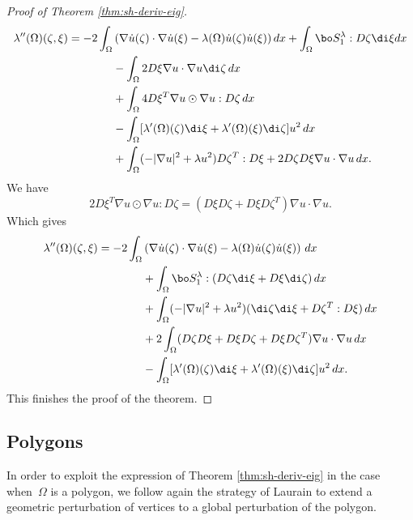 \begin{proof}[Proof of Theorem \ref{thm:sh-deriv-eig}]
\begin{align*}
\lambda''(\Omega)(\zeta,\xi)  = -2\int_\Omega&\left(\nabla \dot u(\zeta)\cdot \nabla \dot u(\xi) - \lambda(\Omega)\dot u(\zeta)\dot u(\xi)\right)dx + \int_\Omega \bo S_1^\lambda :D\zeta \di \xi dx\\
&-\int_\Omega 2D\xi \nabla u \cdot \nabla u \di \zeta\, dx\\
&+\int_\Omega 4 D\xi^T \nabla u \odot \nabla u :D\zeta\, dx \\
& - \int_\Omega [\lambda'(\Omega)(\zeta) \di \xi +\lambda'(\Omega)(\xi)\di \zeta] u^2\, dx\\
& +\int_\Omega (-|\nabla u|^2+\lambda u^2) D\zeta^T: D\xi +2 D\zeta D\xi \nabla u \cdot \nabla u\, dx .
\end{align*}
We have
\[
2D\xi^T \nabla u \odot \nabla u :D\zeta = (D\xi D\zeta + D\xi D\zeta^T)\nabla u \cdot \nabla u.
\]
Which gives
\begin{align*}
\lambda''(\Omega)(\zeta,\xi) = -2\int_\Omega &\left(\nabla \dot u(\zeta)\cdot \nabla \dot u(\xi) -\lambda(\Omega)\dot u(\zeta)\dot u(\xi)\right)\, dx \\
&+ \int_\Omega \bo S_1^\lambda :(D\zeta \di \xi+D\xi \di \zeta)\, dx \\
&+\int_\Omega (-|\nabla u|^2+\lambda u^2)(\di \zeta \di \xi+D\zeta^T:D\xi)\, dx\\
&+2\int_\Omega (D\zeta D\xi +D\xi D\zeta + D\xi D\zeta^T)\nabla u \cdot \nabla u\, dx\\
& - \int_\Omega [\lambda'(\Omega)(\zeta) \di \xi +\lambda'(\Omega)(\xi)\di \zeta] u^2\, dx.
\end{align*}
This finishes the proof of the theorem.
\end{proof}


\subsection{Polygons}
In order to exploit the expression of Theorem \ref{thm:sh-deriv-eig} in the case when~$\Omega$ is a polygon, we follow again the strategy of Laurain \cite{laurain2ndDeriv} to extend a geometric perturbation of vertices to a global perturbation of the polygon.


